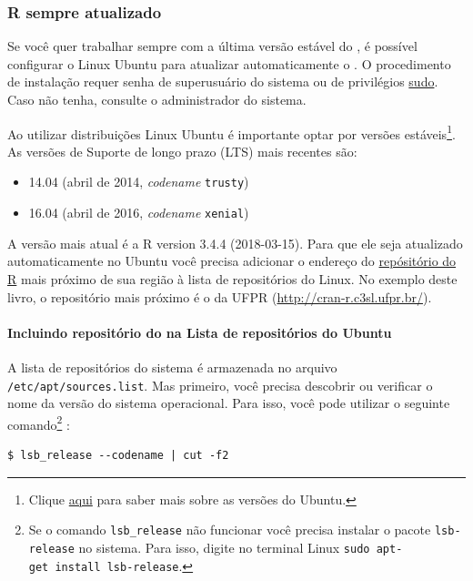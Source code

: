 \documentclass[]{book}
\providecommand{\tightlist}{%
  \setlength{\itemsep}{0pt}\setlength{\parskip}{0pt}}
\let\oldparagraph\paragraph
\renewcommand{\paragraph}[1]{\oldparagraph{#1}\mbox{}}
\let\rmarkdownfootnote\footnote%
\def\footnote{\protect\rmarkdownfootnote}
\begin{document}
\subsubsection{R sempre atualizado}\label{r-sempre-atualizado}

Se você quer trabalhar sempre com a última versão estável do , é
possível configurar o Linux Ubuntu para atualizar automaticamente o . O
procedimento de instalação requer senha de superusuário do sistema ou de
privilégios \href{https://en.wikipedia.org/wiki/Sudo}{sudo}. Caso não
tenha, consulte o administrador do sistema.

Ao utilizar distribuições Linux Ubuntu é importante optar por versões
estáveis\footnote{Clique \href{http://releases.ubuntu.com}{aqui} para
  saber mais sobre as versões do Ubuntu.}. As versões de Suporte de
longo prazo (LTS) mais recentes são:

\begin{itemize}
\tightlist
\item
  14.04 (abril de 2014, \emph{codename} \texttt{trusty})
\item
  16.04 (abril de 2016, \emph{codename} \texttt{xenial})
\end{itemize}

A versão mais atual é a R version 3.4.4 (2018-03-15). Para que ele seja
atualizado automaticamente no Ubuntu você precisa adicionar o endereço
do \href{http://cran.r-project.org/mirrors.html}{repósitório do R} mais
próximo de sua região à lista de repositórios do Linux. No exemplo deste
livro, o repositório mais próximo é o da UFPR
(\url{http://cran-r.c3sl.ufpr.br/}).

\paragraph{\texorpdfstring{Incluindo repositório do na Lista de
repositórios do
Ubuntu}{Incluindo repositório do  na Lista de repositórios do Ubuntu}}\label{incluindo-repositorio-do-na-lista-de-repositorios-do-ubuntu}

A lista de repositórios do sistema é armazenada no arquivo
\texttt{/etc/apt/sources.list}. Mas primeiro, você precisa descobrir ou
verificar o nome da versão do sistema operacional. Para isso, você pode
utilizar o seguinte comando\footnote{Se o comando \texttt{lsb\_release}
  não funcionar você precisa instalar o pacote \texttt{lsb-release} no
  sistema. Para isso, digite no terminal Linux
  \texttt{sudo\ apt-get\ install\ lsb-release}.} :

\begin{verbatim}
$ lsb_release --codename | cut -f2
\end{verbatim}
\end{document}
